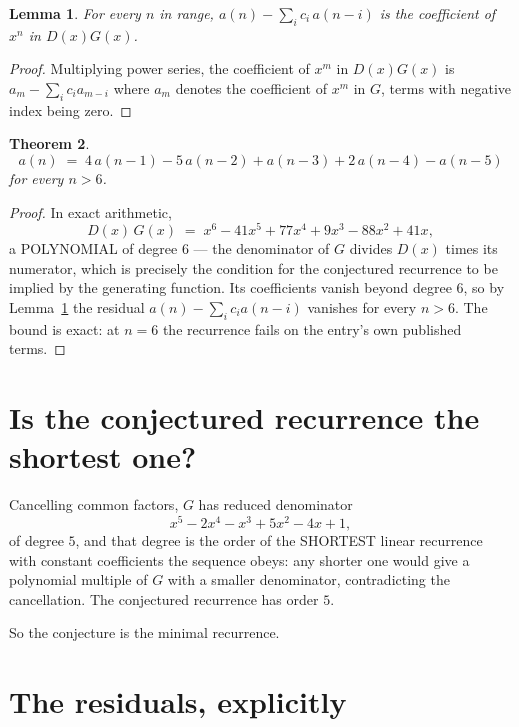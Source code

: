 \documentclass[11pt,a4paper]{article}
\theoremstyle{plain}
\newtheorem{theorem}{Theorem}
\newtheorem{lemma}[theorem]{Lemma}
\theoremstyle{definition}
\begin{document}
\begin{lemma}\label{lem:key}
For every $n$ in range, $a(n)-\sum_i c_i\,a(n-i)$ is the coefficient of $x^{n}$ in
$D(x)G(x)$.
\end{lemma}

\begin{proof}
Multiplying power series, the coefficient of $x^{m}$ in $D(x)G(x)$ is
$a_m-\sum_i c_i a_{m-i}$ where $a_m$ denotes the coefficient of $x^{m}$ in $G$, terms with
negative index being zero.
\end{proof}

\begin{theorem}
\[
a(n)\;=\;4\,a(n-1) - 5\,a(n-2) + a(n-3) + 2\,a(n-4) - a(n-5)
\]
for every $n>6$.
\end{theorem}

\begin{proof}
In exact arithmetic,
\[
D(x)\,G(x)\;=\;x^{6} - 41 x^{5} + 77 x^{4} + 9 x^{3} - 88 x^{2} + 41 x,
\]
a POLYNOMIAL of degree $6$ --- the denominator of $G$ divides $D(x)$ times its numerator,
which is precisely the condition for the conjectured recurrence to be implied by the
generating function. Its coefficients vanish beyond degree $6$, so by
Lemma~\ref{lem:key} the residual $a(n)-\sum_ic_ia(n-i)$ vanishes for every
$n>6$. The bound is exact: at $n=6$ the recurrence fails on the entry's own published terms.
\end{proof}

\section{Is the conjectured recurrence the shortest one?}

Cancelling common factors, $G$ has reduced denominator
\[
x^{5} - 2 x^{4} - x^{3} + 5 x^{2} - 4 x + 1,
\]
of degree $5$, and that degree is the order of the SHORTEST linear recurrence with
constant coefficients the sequence obeys: any shorter one would give a polynomial multiple of
$G$ with a smaller denominator, contradicting the cancellation. The conjectured recurrence has
order $5$.

So the conjecture is the minimal recurrence.

\section{The residuals, explicitly}
\end{document}
